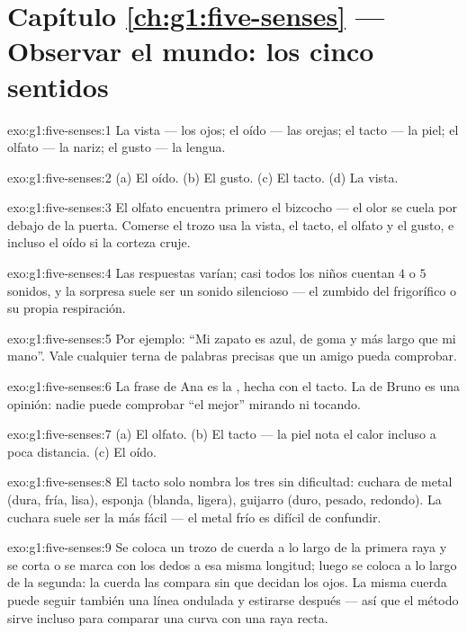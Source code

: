 \section*{Capítulo \ref{ch:g1:five-senses} --- Observar el mundo: los cinco sentidos}

\begin{solution}{exo:g1:five-senses:1}
La vista --- los ojos; el oído --- las orejas; el tacto --- la piel; el
olfato --- la nariz; el gusto --- la lengua.
\end{solution}

\begin{solution}{exo:g1:five-senses:2}
(a) El oído. (b) El gusto. (c) El tacto. (d) La vista.
\end{solution}

\begin{solution}{exo:g1:five-senses:3}
El olfato encuentra primero el bizcocho --- el olor se cuela por
debajo de la puerta. Comerse el trozo usa la vista, el tacto, el
olfato y el gusto, e incluso el oído si la corteza cruje.
\end{solution}

\begin{solution}{exo:g1:five-senses:4}
Las respuestas varían; casi todos los niños cuentan $4$ o $5$ sonidos,
y la sorpresa suele ser un sonido silencioso --- el zumbido del
frigorífico o su propia respiración.
\end{solution}

\begin{solution}{exo:g1:five-senses:5}
Por ejemplo: ``Mi zapato es azul, de goma y más largo que mi mano''.
Vale cualquier terna de palabras precisas que un amigo pueda
comprobar.
\end{solution}

\begin{solution}{exo:g1:five-senses:6}
La frase de Ana es la , hecha con el tacto. La de Bruno es
una opinión: nadie puede comprobar ``el mejor'' mirando ni tocando.
\end{solution}

\begin{solution}{exo:g1:five-senses:7}
(a) El olfato. (b) El tacto --- la piel nota el calor incluso a poca
distancia. (c) El oído.
\end{solution}

\begin{solution}{exo:g1:five-senses:8}
El tacto solo nombra los tres sin dificultad: cuchara de metal (dura,
fría, lisa), esponja (blanda, ligera), guijarro (duro, pesado,
redondo). La cuchara suele ser la más fácil --- el metal frío es
difícil de confundir.
\end{solution}

\begin{solution}{exo:g1:five-senses:9}
Se coloca un trozo de cuerda a lo largo de la primera raya y se corta
o se marca con los dedos a esa misma longitud; luego se coloca a lo
largo de la segunda: la cuerda las compara sin que decidan los ojos.
La misma cuerda puede seguir también una línea ondulada y estirarse
después --- así que el método sirve incluso para comparar una curva
con una raya recta.
\end{solution}
